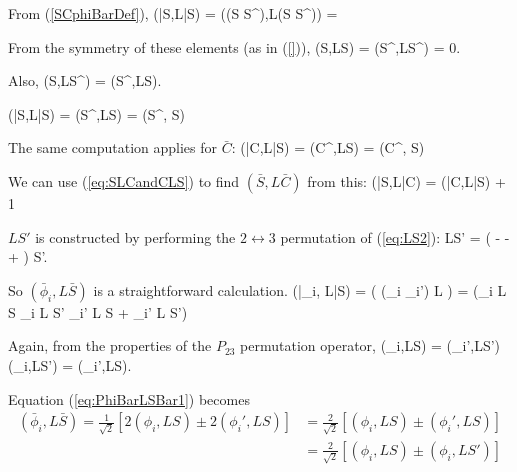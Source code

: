 \documentclass[Dissertation.tex]{subfiles}
\begin{document}
From (\ref{SCphiBarDef}),
\beq
(\bar{S},L\bar{S}) =  \left((S \pm S^\prime),L(S \pm S^\prime)\right) =  
\eeq

\noindent From the symmetry of these elements (as in (\ref{})),
\beq
(S,LS) = (S^\prime,LS^\prime) = 0.
\eeq

\noindent Also,
\beq
(S,LS^\prime) = (S^\prime,LS).
\eeq

\beq
(\bar{S},L\bar{S}) = \pm \left(S^\prime,LS\right) = \pm \left(S^\prime,  S\right)
\label{eq:SbarLSbar}
\eeq

The same computation applies for $\bar{C}$:
\beq
(\bar{C},L\bar{S}) = \pm \left(C^\prime,LS\right) = \pm \left(C^\prime,  S\right)
\label{eq:CbarLSbar}
\eeq

We can use (\ref{eq:SLCandCLS}) to find $(\bar{S},L\bar{C})$ from this:
\beq
\left(\bar{S},L\bar{C}\right) = \left(\bar{C},L\bar{S}\right) + 1
\label{eq:SLCandCLSBar}
\eeq

$LS'$ is constructed by performing the $2 \leftrightarrow 3$ permutation of (\ref{eq:LS2}):
\beq
\label{eq:LSP2}
LS' = \left(  -  -  +  \right) S'.
\eeq

So $(\bar{\phi}_i, L\bar{S})$ is a straightforward calculation.
\beq
\label{eq:PhiBarLSBar1}
(\bar{\phi}_i, L\bar{S}) = \left( (\phi_i \pm \phi_i') L \right)
=  \left(\phi_i L S \pm \phi_i L S' \pm \phi_i' L S + \phi_i' L S'\right)
\eeq

Again, from the properties of the $P_{23}$ permutation operator,
\beq
(\phi_i,LS) = (\phi_i',LS')  (\phi_i,LS') = (\phi_i',LS).
\eeq

Equation (\ref{eq:PhiBarLSBar1}) becomes
\begin{subequations}
\label{eq:PhiBarLSBar2}
\begin{align}
(\bar{\phi}_i, L\bar{S}) = \frac{1}{\sqrt{2}} \left[2(\phi_i,LS) \pm 2(\phi_i',LS)\right] &= \frac{2}{\sqrt{2}} \left[(\phi_i,LS) \pm (\phi_i',LS)\right] \label{eq:PhiBarLSBar2a} \\
 &= \frac{2}{\sqrt{2}} \left[(\phi_i,LS) \pm (\phi_i,LS')\right]  \label{eq:PhiBarLSBar2b}
\end{align}
\end{subequations}
\end{document}
